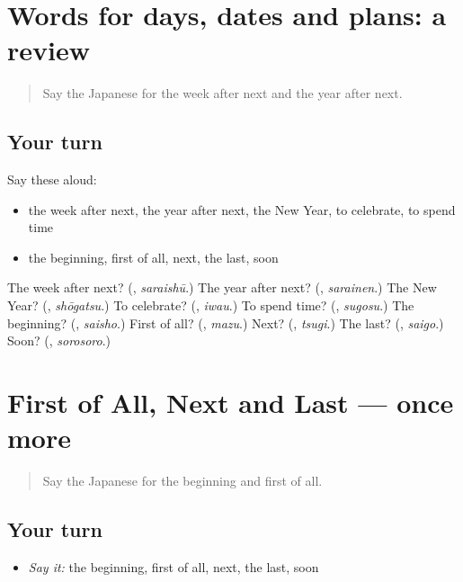 \section[(dialogue)]{Words for days, dates and plans: a review}

\label{lesson:JA-R171-review-170-171}



\begin{quote}
Say the Japanese for the week after next and the year after next.
\end{quote}

\subsection*{Your turn}
Say these aloud:

\begin{itemize}
\raggedright
  \item the week after next, the year after next, the New Year, to celebrate, to spend time
  \item the beginning, first of all, next, the last, soon
\end{itemize}

\begin{tcolorbox}[breakable,colback=teal!4,colframe=teal!35!black,title={Before you move on}]
The week after next? (\textbf{}, \emph{saraishū}.) The year after next? (\textbf{}, \emph{sarainen}.) The New Year? (\textbf{}, \emph{shōgatsu}.) To celebrate? (\textbf{}, \emph{iwau}.) To spend time? (\textbf{}, \emph{sugosu}.) The beginning? (\textbf{}, \emph{saisho}.) First of all? (\textbf{}, \emph{mazu}.) Next? (\textbf{}, \emph{tsugi}.) The last? (\textbf{}, \emph{saigo}.) Soon? (\textbf{}, \emph{sorosoro}.)
\end{tcolorbox}
\section[(dialogue)]{First of All, Next and Last — once more}

\label{lesson:JA-R171-review-final-171}



\begin{quote}
Say the Japanese for the beginning and first of all.
\end{quote}

\subsection*{Your turn}
\begin{itemize}
\raggedright
  \item \emph{Say it:} the beginning, first of all, next, the last, soon
\end{itemize}


